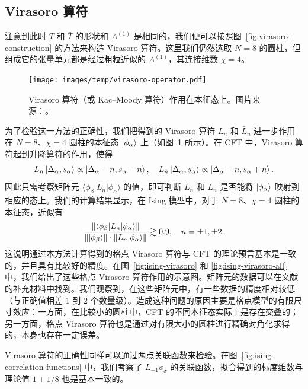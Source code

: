 \subsection{Virasoro 算符}
\label{subsec:ising-virasoro-operator}

注意到此时 $T$ 和 $\bar{T}$ 的形状和 $A^{(1)}$ 是相同的，我们便可以按照图~\ref{fig:virasoro-construction} 的方法来构造 Virasoro 算符。这里我们仍然选取 $N=8$ 的圆柱，但组成它的张量单元都是经过粗粒近似的 $A^{(1)}$，其连接维数 $\chi=4$。

\begin{figure}[ht]
  \centering
  \texttt{[image: images/temp/virasoro-operator.pdf]}
  \caption[Virasoro 算符作用在本征态上]{Virasoro 算符（或 Kac--Moody 算符）作用在本征态上。图片来源：\parencite{wang2022virasoro}。}
  \label{fig:virasoro-operator}
\end{figure}

为了检验这一方法的正确性，我们把得到的 Virasoro 算符 $L_n$ 和 $\bar{L}_n$ 进一步作用在 $N=8$、$\chi=4$ 圆柱的本征态 $\ket*{\phi_\alpha}$ 上（如图~\ref{fig:virasoro-operator} 所示）。在 CFT 中，Virasoro 算符起到升降算符的作用，使得
\begin{equation}
  L_n         \ket{\Delta_\alpha, s_\alpha} \propto \ket{\Delta_\alpha-n, s_\alpha-n}, \quad
  L_{\bar{n}} \ket{\Delta_\alpha, s_\alpha} \propto \ket{\Delta_\alpha-n, s_\alpha+n}.
\end{equation}
因此只需考察矩阵元 $\langle\phi_\beta|L_n|\phi_\alpha\rangle$ 的值，即可判断 $L_n$ 和 $\bar{L}_n$ 是否能将 $\ket*{\phi_\alpha}$ 映射到相应的态上。我们的计算结果显示，在 Ising 模型中，对于 $N=8$、$\chi=4$ 圆柱的本征态，近似有
\begin{equation}
  \frac{\lVert \langle\phi_\beta|L_n|\phi_\alpha\rangle \rVert}{\lVert \ket*{\phi_\beta} \rVert \cdot \lVert L_n\ket*{\phi_\alpha} \rVert} \gtrsim 0.9, \quad
  n=\pm1, \pm2.
\end{equation}
这说明通过本方法计算得到的格点 Virasoro 算符与 CFT 的理论预言基本是一致的，并且具有比较好的精度。在图~\ref{fig:ising-virasoro} 和 \ref{fig:ising-virasoro-all} 中，我们给出了这些格点 Virasoro 算符作用的示意图。矩阵元的数据可以在文献 \parencite{wang2022virasoro} 的补充材料中找到。我们观察到，在这些矩阵元中，有一些数据的精度相对较低（与正确值相差 1 到 2 个数量级）。造成这种问题的原因主要是格点模型的有限尺寸效应：一方面，在比较小的圆柱中，CFT 的不同本征态实际上是存在交叠的；另一方面，格点 Virasoro 算符也是通过对有限大小的圆柱进行精确对角化求得的，本身也存在一定误差。

Virasoro 算符的正确性同样可以通过两点关联函数来检验。在图~\ref{fig:ising-correlation-functions} 中，我们考察了 $L_{-1}\phi_\sigma$ 的关联函数，拟合得到的标度维数与理论值 $1+1/8$ 也是基本一致的。


